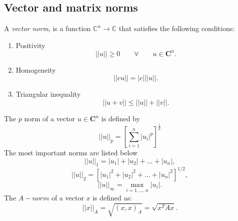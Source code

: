 \documentclass[a4paper,10pt]{report}
\begin{document}
\subsection{Vector and matrix norms}
A \emph{vector norm}, is a function $\mathbb{C}^n \to \mathbb{C}$ that satisfies the following
conditions:
\begin{enumerate}
 \item Positivity
 \begin{equation*}
  ||u|| \geq 0 \qquad \forall \qquad u\in \mathbf{C}^n.
 \end{equation*}
\item Homogeneity 
 \begin{equation*}
  ||cu||=|c|||u||.
 \end{equation*}
 \item Triangular inequality
  \begin{equation*}
  ||u+v|| \leq ||u|| +||v||.
 \end{equation*}
\end{enumerate}
The $p$ norm of a vector $u\in \mathbf{C}^n$ is defined by
 \begin{equation*}
  ||u||_p=\left[ \sum_{i=1}^n|u_i|^p\right]^{\frac{1}{p}}
 \end{equation*}
 The most important norms are listed below
$$||u||_1=|u_1|+|u_2|+...+|u_n|,$$
$$||u||_2=\left[|u_1|^2+|u_2|^2+...+|u_n|^2\right]^{1/2},$$
$$||u||_{\infty}=\max_{i=1,...,n}|u_i|.$$
The $A-norm$ of a vector $x$ is defined as:
\begin{equation} \label{Anorm}
 ||x||_A= \sqrt{(x,x)_A}=\sqrt{x^TAx}.
\end{equation}
\end{document}
